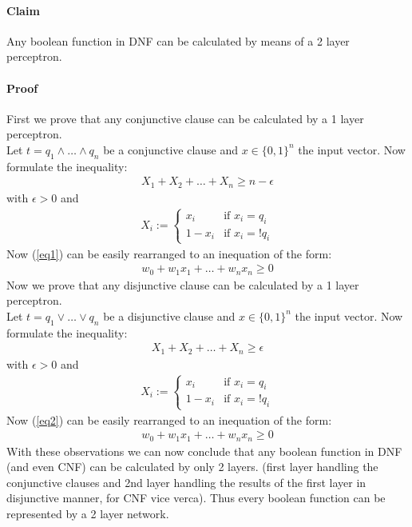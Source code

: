 \paragraph{Claim}
Any boolean function in DNF can be calculated by means of a 2 layer perceptron.

\paragraph{Proof}
First we prove that any conjunctive clause can be calculated by a 1 layer perceptron.\\
Let $t = q_1 \wedge \ldots \wedge q_n$ be a conjunctive clause and $x\in\{0,1\}^n$ the input vector. Now formulate the inequality:
\begin{align}
	X_1 + X_2 + \ldots +X_n \geq n -\epsilon
	\label{eq1}
\end{align}
with $\epsilon > 0$ and
\begin{align*}
X_i := 
\begin{cases} 
	x _i &\mbox{if } x_i = q_i  \\ 
	1-x _i &\mbox{if } x_i = !q_i
\end{cases} 
\end{align*}
Now (\ref{eq1}) can be easily rearranged to an inequation of the form:
\begin{align*}
	w_0 + w_1x_1 + \ldots + w_nx_n \geq 0
\end{align*}
Now we prove that any disjunctive clause can be calculated by a 1 layer perceptron.\\
Let $t = q_1 \vee \ldots \vee q_n$ be a disjunctive clause and $x\in\{0,1\}^n$ the input vector. Now formulate the inequality:
\begin{align}
X_1 + X_2 + \ldots +X_n \geq \epsilon
\label{eq2}
\end{align}
with $\epsilon > 0$ and
\begin{align*}
X_i := 
\begin{cases} 
	x _i &\mbox{if } x_i = q_i  \\ 
	1-x _i &\mbox{if } x_i = !q_i
\end{cases} 
\end{align*}
Now (\ref{eq2}) can be easily rearranged to an inequation of the form:
\begin{align*}
	w_0 + w_1x_1 + \ldots + w_nx_n \geq 0
\end{align*}
With these observations we can now conclude that any boolean function in DNF (and even CNF) can be calculated by only 2 layers.
(first layer handling the conjunctive clauses and 2nd layer handling the results of the first layer in disjunctive manner, for CNF vice verca).
Thus every boolean function can be represented by a 2 layer network.
